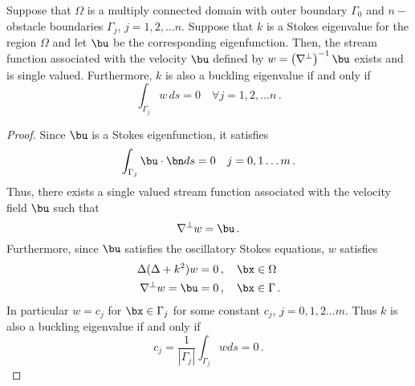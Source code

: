 
\appendix

\begin{lem}
Suppose that $\Omega$ is a multiply connected domain with outer boundary
$\Gamma_{0}$ and $n-$ obstacle boundaries $\Gamma_{j}$, $j=1,2,\ldots n$. 
Suppose that $k$ is a Stokes eigenvalue for the region $\Omega$ and 
let $\bu$ be the corresponding eigenfunction. 
Then, the stream function associated with the velocity $\bu$ defined by
$w = \left(\nabla^{\perp} \right)^{-1} \bu$ exists and is single valued. 
Furthermore, $k$ is also a buckling eigenvalue if and only if
\begin{equation}
\int_{\Gamma_{j}} w\, ds = 0 \quad \forall j=1,2,\ldots n \, .
\end{equation}
\end{lem}

\begin{proof}
Since $\bu$ is a Stokes eigenfunction, it satisfies
\begin{equation}
\int_{\Gamma_{j}} \bu \cdot \bn ds = 0 \quad j=0,1\ldots m \, .
\end{equation}
Thus, there exists a single valued stream function associated with the
velocity field $\bu$ such that 
\begin{equation}
\nabla^{\perp} w = \bu \, .
\end{equation}
Furthermore, since $\bu$ satisfies the oscillatory Stokes equations, 
$w$ satisfies
\begin{align}
\Delta (\Delta + k^{2} ) w &= 0 \, , \quad \bx \in \Omega \\
\nabla^{\perp} w = \bu &=0 \, ,\quad \bx \in \Gamma \, .
\end{align}
In particular $w= c_{j}$ for $\bx \in \Gamma_{j}$ for
some constant $c_{j}$, $j=0,1,2\ldots m$.
Thus $k$ is also a buckling eigenvalue if and only if 
\begin{equation}
c_{j} = \frac{1}{|\Gamma_{j}|}\int_{\Gamma_{j}} w ds =  0 \, .
\end{equation}
\end{proof}

